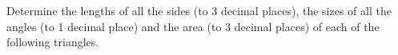 \setlength{\columnseprule}{0.5pt}
\def\columnseprulecolor{\color{blue}}
\question Determine the lengths of all the sides (to 3 decimal places), 
the sizes of all the angles (to 1 decimal place) 
and the area (to 3 decimal places) of each of the following triangles.
